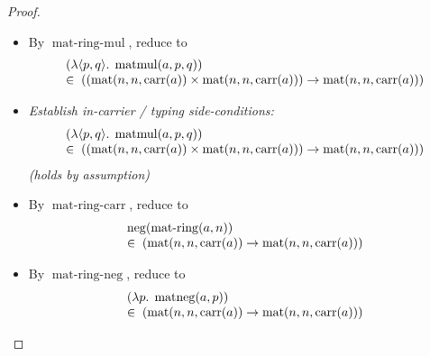 \documentclass[11pt]{article}
\theoremstyle{plain}
\begin{document}
\begin{proof}
\begin{itemize}[leftmargin=2.8em, itemsep=4pt, parsep=1pt]
  \item[\textbf{30}] By $\operatorname{mat\text{-}ring\text{-}mul}$, reduce to
\begin{equation*}
\begin{array}{@{}l@{}} (\lambda \langle p, q \rangle.\; \operatorname{matmul}(a, p, q)) \\ \in\; ((\operatorname{mat}(n, n, \operatorname{carr}(a)) \times \operatorname{mat}(n, n, \operatorname{carr}(a))) \to \operatorname{mat}(n, n, \operatorname{carr}(a))) \end{array}
\end{equation*}

  \item[\textbf{31--32}] \emph{Establish in-carrier / typing side-conditions:}
\begin{equation*}
\begin{array}{@{}l@{}}
\begin{array}{@{}l@{}} (\lambda \langle p, q \rangle.\; \operatorname{matmul}(a, p, q)) \\ \in\; ((\operatorname{mat}(n, n, \operatorname{carr}(a)) \times \operatorname{mat}(n, n, \operatorname{carr}(a))) \to \operatorname{mat}(n, n, \operatorname{carr}(a))) \end{array}
\end{array}
\end{equation*}
  \emph{(holds by assumption)}
  \item[\textbf{33}] By $\operatorname{mat\text{-}ring\text{-}carr}$, reduce to
\begin{equation*}
\begin{array}{@{}l@{}} \operatorname{neg}(\operatorname{mat\text{-}ring}(a, n)) \\ \in\; (\operatorname{mat}(n, n, \operatorname{carr}(a)) \to \operatorname{mat}(n, n, \operatorname{carr}(a))) \end{array}
\end{equation*}

  \item[\textbf{34}] By $\operatorname{mat\text{-}ring\text{-}neg}$, reduce to
\begin{equation*}
\begin{array}{@{}l@{}} (\lambda p.\; \operatorname{matneg}(a, p)) \\ \in\; (\operatorname{mat}(n, n, \operatorname{carr}(a)) \to \operatorname{mat}(n, n, \operatorname{carr}(a))) \end{array}
\end{equation*}


\end{itemize}
\end{proof}
\end{document}
